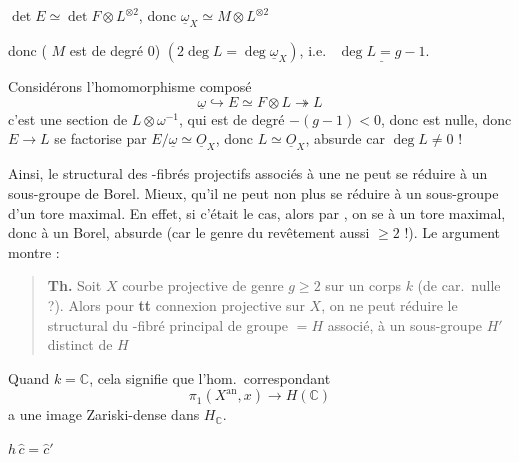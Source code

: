 \documentclass[11pt,a4paper]{article}
\begin{document}
$\det E \simeq \det F \otimes L^{\otimes 2}$, donc $\underline{\omega}_X \simeq M \otimes L^{\otimes 2}$

donc ( $M$ est de degré $0$) $(2\deg L = \deg \underline{\omega}_X)$,
i.e.\  $\underline{\deg L = g-1}$.

Considérons l'homomorphisme composé
\[
  \underline{\omega} \hookrightarrow E \simeq F \otimes L \twoheadrightarrow L
\]
c'est une section de $L \otimes \omega^{-1}$, qui est de degré $-(g-1) < 0$, donc
\ill{} est nulle, donc  $E \to L$ se factorise par
$E/\underline{\omega} \simeq \underline{O}_X$, donc $L \simeq \underline{O}_X$,
absurde car $\deg L \neq 0$ !

Ainsi, le   structural des \ill{}-fibrés projectifs
associés à une \ill{} ne peut se réduire à un sous-groupe de Borel.
Mieux, qu'il ne peut non plus se réduire à un sous-groupe
 d'un tore maximal. En effet, si c'était le cas, alors
par , on se  à
un tore maximal, donc à un Borel, absurde (car le genre du revêtement
 aussi $\geqslant 2$ !). Le \ill{} argument montre :

\begin{quote}
\textbf{Th.} Soit $X$ courbe projective  de genre $g \geqslant 2$ sur
un corps $k$ (de car.\ nulle ?). Alors pour \textbf{tt} connexion projective sur
$X$, on ne peut réduire le  structural du \ill{}-fibré principal de
groupe  $= H$ associé, à un sous-groupe
\struck{\ill{}} $H'$ distinct de $H$ \ill{}
\end{quote}

Quand $k = \mathbb{C}$, cela signifie que l'hom.\ correspondant
\[
  \pi_1(X^{\mathrm{an}}, x) \longrightarrow H(\mathbb{C})
\]
a une image Zariski-dense dans $H_{\mathbb{C}}$.

$h\,\hat{c} = \hat{c}'$
\end{document}
